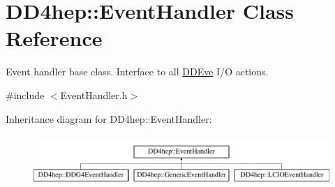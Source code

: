 \hypertarget{class_d_d4hep_1_1_event_handler}{}\section{D\+D4hep\+:\+:Event\+Handler Class Reference}
\label{class_d_d4hep_1_1_event_handler}


Event handler base class. Interface to all \hyperlink{struct_d_d4hep_1_1_d_d_eve}{D\+D\+Eve} I/O actions.  




{\ttfamily \#include $<$Event\+Handler.\+h$>$}

Inheritance diagram for D\+D4hep\+:\+:Event\+Handler\+:\begin{figure}[H]
\begin{center}
\leavevmode
\includegraphics[height=1.924399cm]{class_d_d4hep_1_1_event_handler}
\end{center}
\end{figure}

